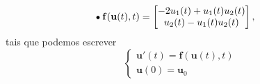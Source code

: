 \documentclass[../differential_methods.tex]{subfiles}
\begin{document}
\begin{example}
\begin{align*}
		 & \tikz[baseline=-0.5ex]\draw[black, fill=black, radius=1.5pt](0, 0)circle;\; \mathbf{f}(\mathbf{u}(t), t) = \begin{bmatrix}
			                                                                                                              -2u_1(t)+u_1(t)u_2(t) \\
			                                                                                                              u_2(t)-u_1(t)u_2(t)
		                                                                                                              \end{bmatrix},
	\end{align*}
	tais que podemos escrever
	\[
		\left\{\begin{array}{ll}
			\mathbf{u}'(t)=\mathbf{f}(\mathbf{u}(t), t) \\
			\mathbf{u}(0)=\mathbf{u}_{0}
		\end{array}\right.
	\]
\end{example}
\end{document}
